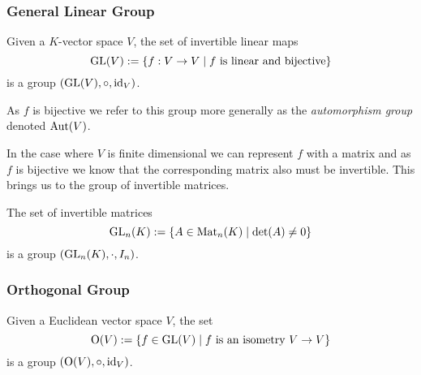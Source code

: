 % 

\subsubsection{General Linear Group}\label{sssec:gen_lin_grp}
\begin{proposition}
   Given a \(K\)-vector space \(V\), the set of invertible linear maps
   \[\operatorname{GL}(V) := \{f: V \to V \mid f~\text{is linear and bijective}\}\]
   is a group \((\operatorname{GL}(V), \circ, \operatorname{id}_V)\).
\end{proposition}
\begin{remark}
   As \(f\) is bijective we refer to this group more generally as the \emph{automorphism group} denoted \(\operatorname{Aut}(V)\).
\end{remark}

In the case where \(V\) is finite dimensional we can represent \(f\) with a matrix and as \(f\) is bijective we know that the corresponding matrix also must be invertible.
This brings us to the group of invertible matrices.

\begin{proposition}\label{pro:glm}
   The set of invertible matrices
   \[\operatorname{GL}_n(K) := \{A \in \operatorname{Mat}_n(K) \mid \det(A) \neq 0\}\]
   is a group \((\operatorname{GL}_n(K), \cdot, I_n)\).
\end{proposition}

\subsubsection{Orthogonal Group}
\begin{proposition}
   Given a Euclidean vector space \(V\), the set
   \[\operatorname{O}(V) := \{f \in \operatorname{GL}(V) \mid f~\text{is an isometry}~V \to V\}\]
   is a group \((\operatorname{O}(V), \circ, \operatorname{id}_V)\).
\end{proposition}


